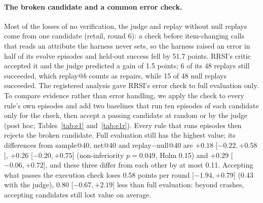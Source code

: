 \documentclass[11pt]{article}
\begin{document}
\paragraph{The broken candidate and a common error check.} Most of the losses of no verification, the judge and replay without null replays come from one candidate (retail, round 6): a check before item-changing calls that reads an attribute the harness never sets, so the harness raised an error in half of its evolve episodes and held-out success fell by 51.7 points. RRSI's critic accepted it and the judge predicted a gain of 1.5 points; 6 of its 48 replays still succeeded, which replay@$b$ counts as repairs, while 15 of 48 null replays succeeded. The registered analysis gave RRSI's error check to full evaluation only. To compare evidence rather than error handling, we apply the check to every rule's own episodes and add two baselines that run ten episodes of each candidate only for the check, then accept a passing candidate at random or by the judge (post hoc; Tables~\ref{tab:e1} and~\ref{tab:e1r}). Every rule that runs episodes then rejects the broken candidate. Full evaluation still has the highest value; its differences from sample@40, net@40 and replay$-$null@40 are $+0.18$ [$-0.22,+0.58$], $+0.26$ [$-0.20,+0.75$] (non-inferiority $p=0.049$, Holm 0.15) and $+0.29$ [$-0.06,+0.72$], and these three differ from each other by at most 0.11. Accepting what passes the execution check loses 0.58 points per round [$-1.94,+0.79$] (0.43 with the judge), 0.80 [$-0.67,+2.19$] less than full evaluation: beyond crashes, accepting candidates still lost value on average.
\end{document}
